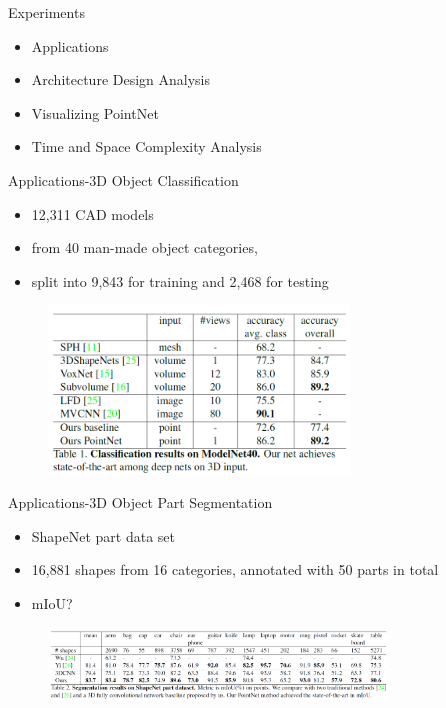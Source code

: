 \documentclass[serif,mathserif]{beamer}
\begin{document}
\begin{frame}{Experiments}
	\begin{itemize}
		\item Applications
		\item Architecture Design Analysis
		\item Visualizing PointNet
		\item Time and Space Complexity Analysis
	\end{itemize}
\end{frame}

\begin{frame}{Applications-3D Object Classification}
	\begin{itemize}
		\item 12,311 CAD models
		\item from 40 man-made object categories, 
		\item split into 9,843 for training and 2,468 for testing
	\end{itemize}
	\begin{figure}
		\includegraphics[width=8cm]{image/application.png}
	\end{figure}
\end{frame}

\begin{frame}{Applications-3D Object Part Segmentation }
	\begin{itemize}
		\item ShapeNet part data set
		\item 16,881 shapes from 16 categories, annotated with 50 parts in total
		\item mIoU?
	\end{itemize}
	\begin{figure}
		\includegraphics[width=9cm]{image/seg.png}
	\end{figure}
\end{frame}
\end{document}
